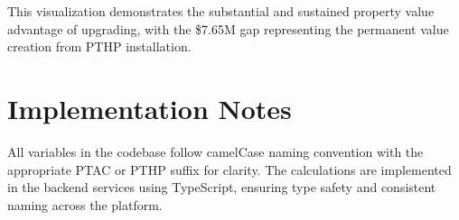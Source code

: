 \documentclass{article}
\begin{document}
\begin{center}
\end{center}

This visualization demonstrates the substantial and sustained property value advantage of upgrading, with the \$7.65M gap representing the permanent value creation from PTHP installation.

\section{Implementation Notes}

All variables in the codebase follow camelCase naming convention with the appropriate PTAC or PTHP suffix for clarity. The calculations are implemented in the backend services using TypeScript, ensuring type safety and consistent naming across the platform.
\end{document}
